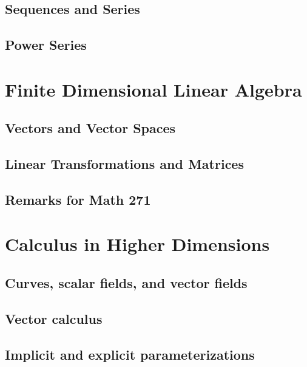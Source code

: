 \documentclass[12pt,letterpaper, openany]{book} %
\begin{document}
\chapter{Sequences and Series}


\chapter{Power Series}


\part{Finite Dimensional Linear Algebra}
\chapter{Vectors and Vector Spaces}


\chapter{Linear Transformations and Matrices}


\chapter*{Remarks for Math 271}


\part{Calculus in Higher Dimensions}

\chapter{Curves, scalar fields, and vector fields}


\chapter{Vector calculus}


\chapter{Implicit and explicit parameterizations}

\end{document}
